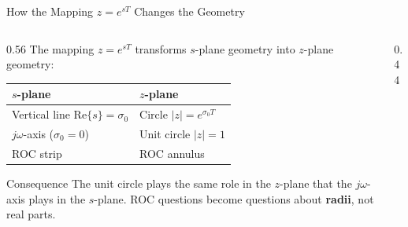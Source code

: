 \begin{frame}[t]{How the Mapping \texorpdfstring{$z=e^{sT}$}{z=e^(sT)} Changes the Geometry}
  \small
  \begin{columns}[T]
    \begin{column}{0.56\textwidth}
      The mapping $z=e^{sT}$ transforms $s$-plane geometry into $z$-plane geometry:

      \vspace{0.15cm}
      {\footnotesize
        \renewcommand{\arraystretch}{1.4}
        \begin{tabular}{@{}l@{\;$\;\longrightarrow\;$\;}l@{}}
          \toprule
          \textbf{$s$-plane} & \textbf{$z$-plane} \\
          \midrule
          Vertical line $\text{Re}\{s\}=\sigma_0$ & Circle $|z|=e^{\sigma_0 T}$ \\
          $j\omega$-axis ($\sigma_0=0$) & Unit circle $|z|=1$ \\
          ROC strip & ROC annulus \\
          \bottomrule
        \end{tabular}
      }

      \vspace{0.15cm}
      \begin{insightbox}{Consequence}
        \footnotesize
        The unit circle plays the same role in the $z$-plane that the $j\omega$-axis plays in the $s$-plane. ROC questions become questions about \textbf{radii}, not real parts.
      \end{insightbox}
    \end{column}
    \begin{column}{0.44\textwidth}
      \begin{center}


\end{center}
\end{column}
\end{columns}
\end{frame}
